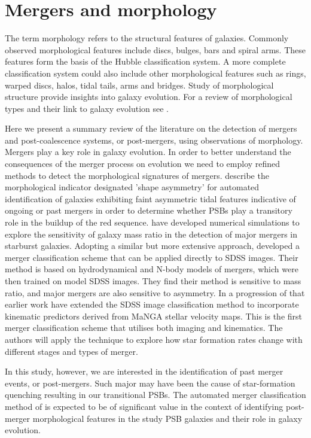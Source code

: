 \section{Mergers and morphology}
\label{sec:mergers}

The term morphology refers to the structural features of galaxies. Commonly observed morphological features include discs, bulges, bars and spiral arms. These features form the basis of the Hubble classification system. A more complete classification system could also include other morphological features such as rings, warped discs, halos, tidal tails, arms and bridges. Study of  morphological structure provide insights into galaxy evolution. For a review of morphological types and their link to galaxy evolution see \cite{2011arXiv1102.0550B}.

Here we present a summary review of the literature on the detection of mergers and post-coalescence systems, or post-mergers, using observations of morphology. Mergers play a key role in galaxy evolution. In order to better understand the consequences of the merger process on evolution we need to employ refined methods to detect the morphological signatures of mergers. \cite{2016MNRAS.456.3032P} describe the morphological indicator designated 'shape asymmetry' for automated identification of galaxies exhibiting faint asymmetric tidal features indicative of ongoing or past mergers in order to determine whether PSBs play a transitory role in the buildup of the red sequence. \cite{2011arXiv1102.0550B} have developed numerical simulations to explore the sensitivity of galaxy mass ratio in the detection of major mergers in starburst galaxies. Adopting a similar but more extensive approach, \cite{2019ApJ...872...76N} developed a merger classification scheme that can be applied directly to SDSS images. Their method is based on hydrodynamical and N-body models of mergers, which were then trained on model SDSS images. They find their method is sensitive to mass ratio, and major mergers are also sensitive to asymmetry. In a progression of that earlier work  \cite{2019DDA....5020304N} have extended the SDSS image classification method to incorporate kinematic predictors derived from MaNGA stellar velocity maps. This is the first merger classification scheme that utilises both imaging and kinematics. The authors will apply the technique to explore how star formation rates change with different stages and types of merger. 

In this study, however, we are interested in the identification of past merger events, or post-mergers. Such major may have been the cause of star-formation quenching resulting in our transitional PSBs. The automated merger classification method of  \cite{2019DDA....5020304N} is expected to be of significant value in the context of identifying post-merger morphological features in the study PSB galaxies and their role in galaxy evolution. 


